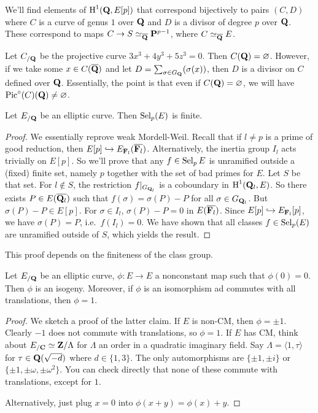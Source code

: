 We'll find elements of $\operatorname{H}^1(\mathbf{Q},E[p])$ that correspond bijectively to 
pairs $(C,D)$ where $C$ is a curve of genus $1$ over $\mathbf{Q}$ and $D$ is a 
divisor of degree $p$ over $\mathbf{Q}$. These correspond to maps 
$C\to S\simeq_{\overline{\mathbf{Q}}} \mathbf{P}^{p-1}$, where $C\simeq_{\overline{\mathbf{Q}}} E$. 

\begin{example}
Let $C_{/\mathbf{Q}}$ be the projective curve $3 x^3+4 y^3+5 z^3=0$. Then 
$C(\mathbf{Q})=\varnothing$. However, if we take some 
$x\in C(\overline{\mathbf{Q}})$ and let $D=\sum_{\sigma\in G_{\mathbf{Q}}} (\sigma(x))$, then 
$D$ is a divisor on $C$ defined over $\mathbf{Q}$. Essentially, the point is that 
even if $C(\mathbf{Q})=\varnothing$, we will have 
$\operatorname{Pic}^\circ(C)(\mathbf{Q})\ne\varnothing$. 
\end{example}

\begin{theorem}
Let $E_{/\mathbf{Q}}$ be an elliptic curve. Then $\operatorname{Sel}_p(E)$ is finite. 
\end{theorem}
\begin{proof}
We essentially reprove weak Mordell-Weil. Recall that if $l\ne p$ is a prime of 
good reduction, then $E[p]\hookrightarrow E_{\mathbf{F}_l}(\overline{\mathbf{F}_l})$. Alternatively, 
the inertia group $I_l$ acts trivially on $E[p]$. So we'll prove that any 
$f\in \operatorname{Sel}_p E$ is unramified outside a (fixed) finite set, namely $p$ 
together with the set of bad primes for $E$. Let $S$ be that set. For 
$l\notin S$, the restriction $f|_{G_{\mathbf{Q}_l}}$ is a coboundary in 
$\operatorname{H}^1(\mathbf{Q}_l,E)$. So there exists $P\in E(\overline{\mathbf{Q}_l})$ such that 
$f(\sigma)=\sigma(P)-P$ for all $\sigma\in G_{\mathbf{Q}_l}$. But 
$\sigma(P)-P\in E[p]$. For $\sigma\in I_l$, $\sigma(P)-P=0$ in 
$E(\overline{\mathbf{F}_l})$. Since $E[p]\hookrightarrow E_{\mathbf{F}_l}[p]$, we have 
$\sigma(P)=P$, i.e.~$f(I_l)=0$. We have shown that all classes 
$f\in \operatorname{Sel}_p(E)$ are unramified outside of $S$, which yields the result. 
\end{proof}

This proof depends on the finiteness of the class group. 

\begin{lemma}
Let $E_{/\mathbf{Q}}$ be an elliptic curve, $\phi:E\to E$ a nonconstant map such 
that $\phi(0)=0$. Then $\phi$ is an isogeny. Moreover, if $\phi$ is an 
isomorphism ad commutes with all translations, then $\phi=1$. 
\end{lemma}
\begin{proof}
We sketch a proof of the latter claim. If $E$ is non-CM, then 
$\phi=\pm 1$. Clearly $-1$ does not commute with translations, so $\phi=1$. If 
$E$ has CM, think about $E_{/\mathbf{C}}\simeq \mathbf{Z}/\Lambda$ for $\Lambda$ an order 
in a quadratic imaginary field. Say $\Lambda=\langle 1,\tau\rangle$ for 
$\tau\in \mathbf{Q}(\sqrt{-d})$ where $d\in \{1,3\}$. The only automorphisms are 
$\{\pm 1,\pm i\}$ or $\{\pm 1,\pm \omega,\pm\omega^2\}$. You can check 
directly that none of these commute with translations, except for $1$. 

Alternatively, just plug $x=0$ into $\phi(x+y)=\phi(x)+y$. 
\end{proof}

